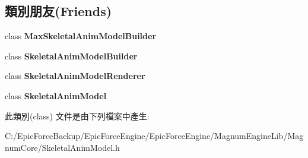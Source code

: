 \subsection*{類別朋友(Friends)}
\begin{DoxyCompactItemize}
\item 
class {\bfseries Max\+Skeletal\+Anim\+Model\+Builder}\hypertarget{class_magnum_1_1endif_1_1_node_a68b08defd5651552ef2b6f922eee7ff9}{}\label{class_magnum_1_1endif_1_1_node_a68b08defd5651552ef2b6f922eee7ff9}

\item 
class {\bfseries Skeletal\+Anim\+Model\+Builder}\hypertarget{class_magnum_1_1endif_1_1_node_a31d58261bc4fbf7a6c1d2d2547437974}{}\label{class_magnum_1_1endif_1_1_node_a31d58261bc4fbf7a6c1d2d2547437974}

\item 
class {\bfseries Skeletal\+Anim\+Model\+Renderer}\hypertarget{class_magnum_1_1endif_1_1_node_ae50fe2cd824b9de98af4dd4aa51d4935}{}\label{class_magnum_1_1endif_1_1_node_ae50fe2cd824b9de98af4dd4aa51d4935}

\item 
class {\bfseries Skeletal\+Anim\+Model}\hypertarget{class_magnum_1_1endif_1_1_node_a88c72f2f6b125ba518843b71080035e5}{}\label{class_magnum_1_1endif_1_1_node_a88c72f2f6b125ba518843b71080035e5}

\end{DoxyCompactItemize}


此類別(class) 文件是由下列檔案中產生\+:\begin{DoxyCompactItemize}
\item 
C\+:/\+Epic\+Force\+Backup/\+Epic\+Force\+Engine/\+Epic\+Force\+Engine/\+Magnum\+Engine\+Lib/\+Magnum\+Core/Skeletal\+Anim\+Model.\+h\end{DoxyCompactItemize}
